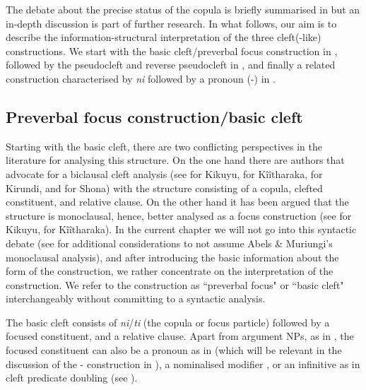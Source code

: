 \documentclass[output=paper]{langscibook}
\begin{document}
\z


The debate about the precise status of the copula is briefly summarised in  but an in-depth discussion is part of further research. In what follows, our aim is to describe the information-structural interpretation of the three cleft(-like) constructions. We start with the basic cleft/preverbal focus construction in , followed by the pseudocleft and reverse pseudocleft in , and finally a related construction characterised by \textit{ni} followed by a pronoun (\NI-\PRO{}) in .

\subsection{Preverbal focus construction/basic cleft}
\label{bkm:Ref117495353}
Starting with the basic cleft, there are two conflicting perspectives in the literature for analysing this structure. On the one hand there are authors that advocate for a biclausal cleft analysis (see \citealt{Bergvall1987} for Kikuyu, \citealt{Harford1997} for Kîîtharaka, \citealt{LafkiouiEtAl2016} for Kirundi, and \citealt{Zentz2016} for Shona) with the structure consisting of a copula, clefted constituent, and relative clause. On the other hand it has been argued that the structure is monoclausal, hence, better analysed as a focus construction (see \citealt{Clements1984,Schwarz2003} for Kikuyu, \citealt{Muriungi2005,AbelsMuriungi2008} for Kîîtharaka). In the current chapter we will not go into this syntactic debate (see \citealt{KanampiuvanderWalFut} for additional considerations to not assume Abels \& Muriungi’s monoclausal analysis), and after introducing the basic information about the form of the construction, we rather concentrate on the interpretation of the construction. We refer to the construction as ``preverbal focus" or ``basic cleft" interchangeably without committing to a syntactic analysis.

The basic cleft consists of \textit{ni}/\textit{ti} (the copula or focus particle) followed by a focused constituent, and a relative clause. Apart from argument NPs, as in , the focused constituent can also be a pronoun as in  (which will be relevant in the discussion of the \NI-\PRO{} construction in ), a nominalised modifier , or an infinitive as in cleft predicate doubling (see ).
\end{document}
